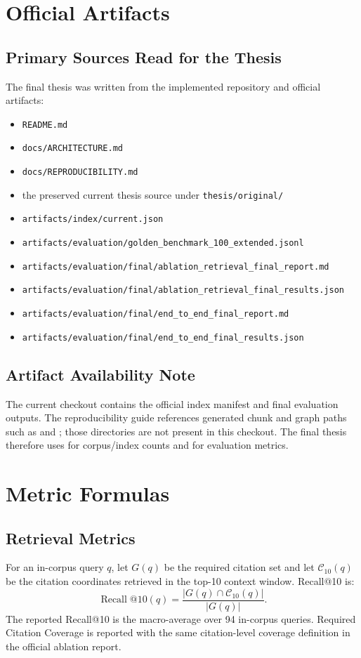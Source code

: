 \section{Official Artifacts}

\subsection{Primary Sources Read for the Thesis}
The final thesis was written from the implemented repository and official artifacts:
\begin{itemize}
  \item \texttt{README.md}
  \item \texttt{docs/ARCHITECTURE.md}
  \item \texttt{docs/REPRODUCIBILITY.md}
  \item the preserved current thesis source under \texttt{thesis/original/}
  \item \texttt{artifacts/index/current.json}
  \item \texttt{artifacts/evaluation/golden\_benchmark\_100\_extended.jsonl}
  \item \texttt{artifacts/evaluation/final/ablation\_retrieval\_final\_report.md}
  \item \texttt{artifacts/evaluation/final/ablation\_retrieval\_final\_results.json}
  \item \texttt{artifacts/evaluation/final/end\_to\_end\_final\_report.md}
  \item \texttt{artifacts/evaluation/final/end\_to\_end\_final\_results.json}
\end{itemize}

\subsection{Artifact Availability Note}
The current checkout contains the official index manifest and final evaluation outputs. The reproducibility guide references generated chunk and graph paths such as  and ; those directories are not present in this checkout. The final thesis therefore uses  for corpus/index counts and  for evaluation metrics.

\section{Metric Formulas}

\subsection{Retrieval Metrics}
For an in-corpus query $q$, let $G(q)$ be the required citation set and let $\mathcal{C}_{10}(q)$ be the citation coordinates retrieved in the top-10 context window. Recall@10 is:
\[
\operatorname{Recall}@10(q) =
\frac{|G(q) \cap \mathcal{C}_{10}(q)|}{|G(q)|}.
\]
The reported Recall@10 is the macro-average over 94 in-corpus queries. Required Citation Coverage is reported with the same citation-level coverage definition in the official ablation report.

